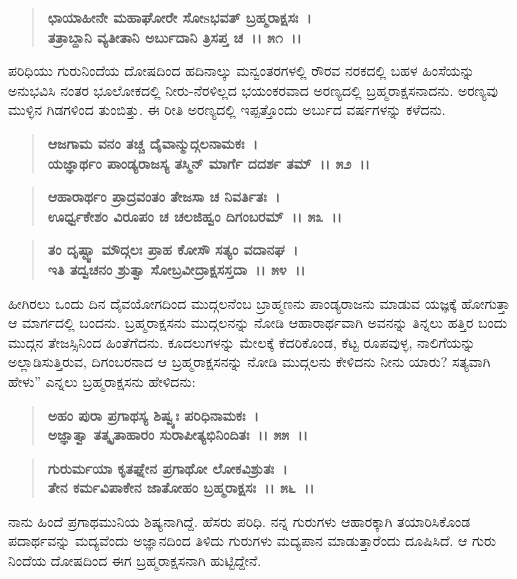 \begin{verse}
\textbf{ಛಾಯಾಹೀನೇ ಮಹಾಘೋರೇ ಸೋsಭವತ್ ಬ್ರಹ್ಮರಾಕ್ಷಸಃ~।}\\\textbf{ತತ್ರಾಬ್ದಾನಿ ವ್ಯತೀತಾನಿ ಅರ್ಬುದಾನಿ ತ್ರಿಸಪ್ತ ಚ~।। ೫೧~।।}
\end{verse}

ಪರಿಧಿಯು ಗುರುನಿಂದೆಯ ದೋಷದಿಂದ ಹದಿನಾಲ್ಕು ಮನ್ವಂತರಗಳಲ್ಲಿ ರೌರವ ನರಕದಲ್ಲಿ ಬಹಳ ಹಿಂಸೆಯನ್ನು ಅನುಭವಿಸಿ ನಂತರ ಭೂಲೋಕದಲ್ಲಿ ನೀರು-ನೆರಳಿಲ್ಲದ ಭಯಂಕರವಾದ ಅರಣ್ಯದಲ್ಲಿ ಬ್ರಹ್ಮರಾಕ್ಷಸನಾದನು. ಅರಣ್ಯವು ಮುಳ್ಳಿನ ಗಿಡಗಳಿಂದ ತುಂಬಿತ್ತು. ಈ ರೀತಿ ಅರಣ್ಯದಲ್ಲಿ ಇಪ್ಪತ್ತೊಂದು ಅರ್ಬುದ ವರ್ಷಗಳನ್ನು ಕಳೆದನು.

\begin{verse}
\textbf{ಆಜಗಾಮ ವನಂ ತಚ್ಚ ದೈವಾನ್ಮುದ್ಗಲನಾಮಕಃ~।}\\\textbf{ಯಜ್ಞಾರ್ಥಂ ಪಾಂಡ್ಯರಾಜಸ್ಯ ತಸ್ಮಿನ್ ಮಾರ್ಗೆ ದದರ್ಶ ತಮ್~।। ೫೨~।। }
\end{verse}

\begin{verse}
\textbf{ಆಹಾರಾರ್ಥಂ ಪ್ರಾದ್ರವಂತಂ ತೇಜಸಾ ಚ ನಿವರ್ತಿತಃ~।}\\\textbf{ಊರ್ಧ್ವಕೇಶಂ ವಿರೂಪಂ ಚ ಚಲಜಿಹ್ವಂ ದಿಗಂಬರಮ್~।। ೫೩~।।}
\end{verse}

\begin{verse}
\textbf{ತಂ ದೃಷ್ಟ್ವಾ ಮೌದ್ಗಲಃ ಪ್ರಾಹ ಕೋಸೌ ಸತ್ಯಂ ವದಾನಘ~।}\\\textbf{ಇತಿ ತದ್ವಚನಂ ಶ್ರುತ್ವಾ ಸೋಬ್ರವೀದ್ರಾಕ್ಷಸಸ್ತದಾ~।। ೫೪~।।}
\end{verse}

ಹೀಗಿರಲು ಒಂದು ದಿನ ದೈವಯೋಗದಿಂದ ಮುದ್ಗಲನೆಂಬ ಬ್ರಾಹ್ಮಣನು ಪಾಂಡ್ಯರಾಜನು ಮಾಡುವ ಯಜ್ಞಕ್ಕೆ ಹೋಗುತ್ತಾ ಆ ಮಾರ್ಗದಲ್ಲಿ ಬಂದನು. ಬ್ರಹ್ಮರಾಕ್ಷಸನು ಮುದ್ಗಲನನ್ನು ನೋಡಿ ಆಹಾರಾರ್ಥವಾಗಿ ಅವನನ್ನು ತಿನ್ನಲು ಹತ್ತಿರ ಬಂದು ಮುದ್ಗನ ತೇಜಸ್ಸಿನಿಂದ ಹಿಂತೆಗೆದನು. ಕೂದಲುಗಳನ್ನು ಮೇಲಕ್ಕೆ ಕೆದರಿಕೊಂಡ, ಕೆಟ್ಟ ರೂಪವುಳ್ಳ, ನಾಲಿಗೆಯನ್ನು ಅಲ್ಲಾಡಿಸುತ್ತಿರುವ, ದಿಗಂಬರನಾದ ಆ ಬ್ರಹ್ಮರಾಕ್ಷಸನನ್ನು ನೋಡಿ ಮುದ್ಗಲನು ಕೇಳಿದನು ನೀನು ಯಾರು? ಸತ್ಯವಾಗಿ ಹೇಳು” ಎನ್ನಲು ಬ್ರಹ್ಮರಾಕ್ಷಸನು ಹೇಳಿದನು:

\begin{verse}
\textbf{ಅಹಂ ಪುರಾ ಪ್ರಗಾಥಸ್ಯ ಶಿಷ್ವ್ಯಃ ಪರಿಧಿನಾಮಕಃ~।}\\\textbf{ಅಜ್ಞಾತ್ವಾ ತತ್ಕೃತಾಹಾರಂ ಸುರಾಪೀತ್ಯಭಿನಿಂದಿತಃ~।। ೫೫~।। }
\end{verse}

\begin{verse}
\textbf{ಗುರುರ್ಮಯಾ ಕೃತಘ್ನೇನ ಪ್ರಗಾಥೋ ಲೋಕವಿಶ್ರುತಃ~।}\\\textbf{ತೇನ ಕರ್ಮವಿಪಾಕೇನ ಜಾತೋಹಂ ಬ್ರಹ್ಮರಾಕ್ಷಸಃ~।। ೫೬~।।}
\end{verse}

ನಾನು ಹಿಂದೆ ಪ್ರಗಾಥಮುನಿಯ ಶಿಷ್ಯನಾಗಿದ್ದೆ. ಹೆಸರು ಪರಿಧಿ. ನನ್ನ ಗುರುಗಳು ಆಹಾರಕ್ಕಾಗಿ ತಯಾರಿಸಿಕೊಂಡ ಪದಾರ್ಥವನ್ನು ಮದ್ಯವೆಂದು ಅಜ್ಞಾನದಿಂದ ತಿಳಿದು ಗುರುಗಳು ಮದ್ಯಪಾನ ಮಾಡುತ್ತಾರೆಂದು ದೂಷಿಸಿದೆ. ಆ ಗುರು ನಿಂದೆಯ ದೋಷದಿಂದ ಈಗ ಬ್ರಹ್ಮರಾಕ್ಷಸನಾಗಿ ಹುಟ್ಟಿದ್ದೇನೆ.

